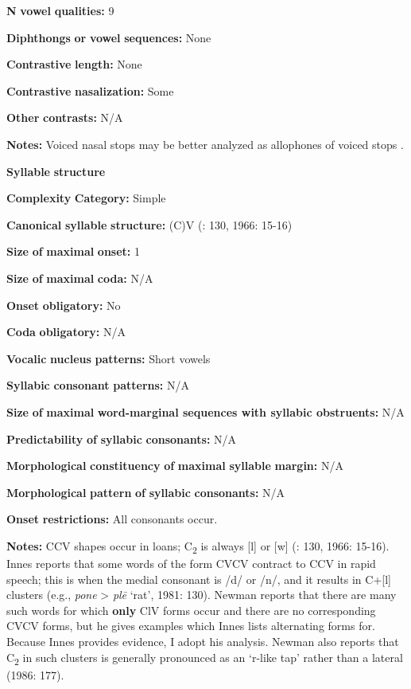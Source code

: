 \begin{styleBody}
\textbf{N} \textbf{vowel} \textbf{qualities:} 9

\textbf{Diphthongs} \textbf{or} \textbf{vowel} \textbf{sequences:} None

\textbf{Contrastive} \textbf{length:} None

\textbf{Contrastive} \textbf{nasalization:} Some

\textbf{Other} \textbf{contrasts:} N/A

\textbf{Notes:} Voiced nasal stops may be better analyzed as allophones of voiced stops \citep[176]{Newman1986}.

\textbf{Syllable} \textbf{structure}

\textbf{Complexity} \textbf{Category:} Simple

\textbf{Canonical} \textbf{syllable} \textbf{structure:} (C)V (\citealt{Innes1981}: 130, 1966: 15-16)

\textbf{Size} \textbf{of} \textbf{maximal} \textbf{onset:} 1

\textbf{Size} \textbf{of} \textbf{maximal} \textbf{coda:} N/A

\textbf{Onset} \textbf{obligatory:} No

\textbf{Coda} \textbf{obligatory:} N/A

\textbf{Vocalic} \textbf{nucleus} \textbf{patterns:} Short vowels

\textbf{Syllabic} \textbf{consonant} \textbf{patterns:} N/A

\textbf{Size} \textbf{of} \textbf{maximal} \textbf{word{}-marginal sequences with syllabic obstruents:} N/A

\textbf{Predictability} \textbf{of} \textbf{syllabic} \textbf{consonants:} N/A

\textbf{Morphological} \textbf{constituency} \textbf{of} \textbf{maximal} \textbf{syllable} \textbf{margin:} N/A

\textbf{Morphological} \textbf{pattern} \textbf{of} \textbf{syllabic} \textbf{consonants:} N/A

\textbf{Onset} \textbf{restrictions:} All consonants occur.

\textbf{Notes:} CCV shapes occur in loans; C\textsubscript{2} is always [l] or [w] (\citealt{Innes1981}: 130, 1966: 15-16). Innes reports that some words of the form CVCV contract to CCV in rapid speech; this is when the medial consonant is /d/ or /n/, and it results in C+[l] clusters (e.g., \textit{pone} > \textit{plē} ‘rat’, 1981: 130). Newman reports that there are many such words for which \textbf{only} ClV forms occur and there are no corresponding CVCV forms, but he gives examples which Innes lists alternating forms for. Because Innes provides evidence, I adopt his analysis. Newman also reports that C\textsubscript{2} in such clusters is generally pronounced as an ‘r-like tap’ rather than a lateral (1986: 177).


\end{styleBody}
